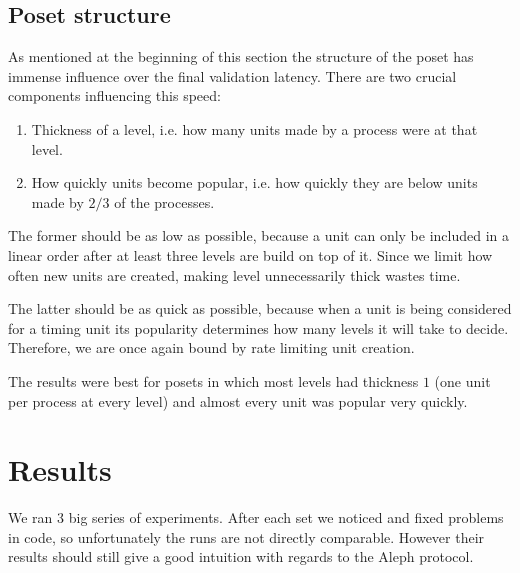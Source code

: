 \documentclass[a4paper,10pt]{article}
\begin{document}
		\subsection{Poset structure}
		 \label{ssec:posetShape}
			As mentioned at the beginning of this section the structure of the poset has immense influence over the final validation latency.
			There are two crucial components influencing this speed:
			\begin{enumerate}
				\item Thickness of a level, i.e. how many units made by a process were at that level.
				\item How quickly units become popular, i.e. how quickly they are below units made by $2/3$ of the processes.
			\end{enumerate}
			The former should be as low as possible, because a unit can only be included in a linear order after at least three levels are build on top of it.
			Since we limit how often new units are created, making level unnecessarily thick wastes time.

			The latter should be as quick as possible, because when a unit is being considered for a timing unit its popularity determines how many levels it will take to decide.
		 Therefore, we are once again bound by rate limiting unit creation.

			The results were best for posets in which most levels had thickness $1$ (one unit per process at every level) and almost every unit was popular very quickly.
	\section{Results}
	 We ran 3 big series of experiments. After each set we noticed and fixed problems in code, so unfortunately the runs are not directly comparable.
		However their results should still give a good intuition with regards to the Aleph protocol.
\end{document}
